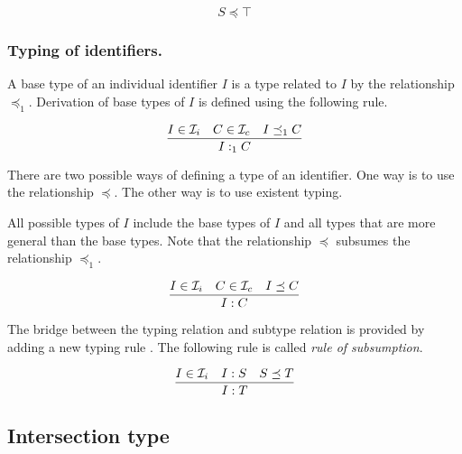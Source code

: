 \documentclass[runningheads]{llncs}
\newcommand{\Ii}{{\cal I}_i}
\newcommand{\Ic}{{\cal I}_c}
\begin{document}
\begin{equation}
S\preceq\top
\end{equation}


\subsubsection{Typing of identifiers.}

\noindent A base type of an individual identifier $I$ is a type
related to $I$ by the relationship $\preceq_1$. Derivation of base
types of $I$ is defined using the following rule.

\begin{equation}
\dfrac{I\in\Ii \quad C\in\Ic \quad I\preceq_1\/C}
      {I:_1C}
\end{equation}

\noindent There are two possible ways of defining a type of an
identifier. One way is to use the relationship $\preceq$. The other
way is to use existent typing.

All possible types of $I$ include the base types of $I$ and all
types that are more general than the base types. Note that the
relationship $\preceq$ subsumes the relationship $\preceq_1$.


\begin{equation}
\dfrac{I\in\Ii \quad C\in\Ic\quad I\preceq\/C}
      {I:C}   
\end{equation}

\noindent The bridge between the typing relation and subtype relation
is provided by adding a new typing rule \cite{Pierce02TypesProgLang}. The
following rule is called \emph{rule of subsumption}.

\begin{equation}
\dfrac{I\in\Ii \quad I:S \quad S\preceq\/T}
      {I:T}    
\end{equation}


  


\subsection{Intersection type}
\end{document}
